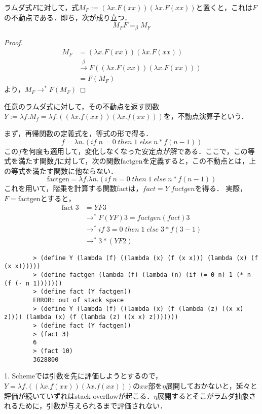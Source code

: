 \documentclass[uplatex, 12pt, dvipdfmx]{jsreport}
\begin{document}
\begin{proposition}
    ラムダ式$F$に対して，式$M_F:=(\lambda x.F(xx))(\lambda x.F(xx))$と置くと，これは$F$の不動点である．即ち，次が成り立つ．
    \[ M_FF=_\beta M_F \]
\end{proposition}
\begin{proof}
    \begin{align*}
        M_F &= (\lambda x.F(xx))(\lambda x.F(xx)) \\
        &\xrightarrow{\beta} F((\lambda x.F(xx))(\lambda x.F(xx))) \\
        &= F(M_F)
    \end{align*}
    より，$M_F\to^*F(M_F)$
\end{proof}
\begin{definition}
    任意のラムダ式に対して，その不動点を返す関数$Y:=\lambda f.M_f=\lambda f.((\lambda x.f(xx))(\lambda x.f(xx)))$を，不動点演算子という．
\end{definition}

\begin{example}[再帰関数の表現：階乗]
    まず，再帰関数の定義式を，等式の形で得る．
    \[ f=\lambda n.(if\; n=0\;then\;1\;else\;n*f(n-1)) \]
    この$f$を何度も適用して，変化しなくなった安定点が解である．ここで，この等式を満たす関数$f$に対して，次の関数$\mathrm{factgen}$を定義すると，この不動点とは，上の等式を満たす関数に他ならない．
    \[ \mathrm{factgen}=\lambda f.\lambda n.(if\; n=0\;then\;1\;else\;n*f(n-1)) \]
    これを用いて，階乗を計算する関数factは，$fact=Y\; factgen$を得る．
    実際，$F=\mathrm{factgen}$とすると，
    \begin{align*}
        \mathrm{fact}\;3 &= YF3\\
        &\to^* F(YF)3 = factgen(fact)3 \\
        &\to^* if\; 3=0\;then\;1\;else\;3*f(3-1) \\
        &\to^* 3*(YF2)
    \end{align*}
\end{example}
\begin{example}[Scheme]
    \begin{lstlisting}
        > (define Y (lambda (f) ((lambda (x) (f (x x))) (lambda (x) (f (x x))))))
        > (define factgen (lambda (f) (lambda (n) (if (= 0 n) 1 (* n (f (- n 1)))))))
        > (define fact (Y factgen))
        ERROR: out of stack space
        > (define Y (lambda (f) ((lambda (x) (f (lambda (z) ((x x) z)))) (lambda (x) (f (lambda (z) ((x x) z)))))))
        > (define fact (Y factgen))
        > (fact 3)
        6
        > (fact 10)
        3628800
    \end{lstlisting}
    1. Schemeでは引数を先に評価しようとするので，$Y=\lambda f.((\lambda x.f(xx))(\lambda x.f(xx)))$の$xx$部を$\eta$展開しておかないと，延々と評価が続いていずれはstack overflowが起こる．$\eta$展開するとそこがラムダ抽象されるために，引数が与えられるまで評価されない．
\end{example}
\end{document}
